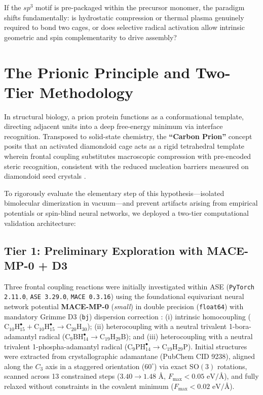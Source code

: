 \documentclass[10pt,twocolumn,a4paper]{article}
\begin{document}
If the $sp^3$ motif is pre-packaged within the precursor monomer, the paradigm shifts fundamentally: is hydrostatic compression or thermal plasma genuinely required to bond two cages, or does selective radical activation allow intrinsic geometric and spin complementarity to drive assembly?

\section{The Prionic Principle and Two-Tier Methodology}
In structural biology, a prion protein functions as a conformational template, directing adjacent units into a deep free-energy minimum via interface recognition. Transposed to solid-state chemistry, the \textbf{``Carbon Prion''} concept posits that an activated diamondoid cage acts as a rigid tetrahedral template wherein frontal coupling substitutes macroscopic compression with pre-encoded steric recognition, consistent with the reduced nucleation barriers measured on diamondoid seed crystals \cite{Gebbie2018}.

To rigorously evaluate the elementary step of this hypothesis—isolated bimolecular dimerization in vacuum—and prevent artifacts arising from empirical potentials or spin-blind neural networks, we deployed a two-tier computational validation architecture:

\subsection{Tier 1: Preliminary Exploration with MACE-MP-0 + D3}
Three frontal coupling reactions were initially investigated within ASE (\texttt{PyTorch 2.11.0}, \texttt{ASE 3.29.0}, \texttt{MACE 0.3.16}) using the foundational equivariant neural network potential \textbf{MACE-MP-0} (\textit{small}) \cite{Batatia2024} in double precision (\texttt{float64}) with mandatory Grimme D3 (\texttt{bj}) dispersion correction \cite{Grimme2010}: (i) intrinsic homocoupling ($\text{C}_{10}\text{H}_{15}^\bullet + \text{C}_{10}\text{H}_{15}^\bullet \to \text{C}_{20}\text{H}_{30}$); (ii) heterocoupling with a neutral trivalent 1-bora-adamantyl radical ($\text{C}_9\text{BH}_{14}^\bullet \to \text{C}_{19}\text{H}_{29}\text{B}$); and (iii) heterocoupling with a neutral trivalent 1-phospha-adamantyl radical ($\text{C}_9\text{PH}_{14}^\bullet \to \text{C}_{19}\text{H}_{29}\text{P}$). Initial structures were extracted from crystallographic adamantane (PubChem CID 9238), aligned along the $C_3$ axis in a staggered orientation ($60^\circ$) via exact $\text{SO}(3)$ rotations, scanned across 13 constrained steps ($3.40 \to 1.48\text{ \AA}$, $F_{\text{max}} < 0.05\text{ eV/\AA}$), and fully relaxed without constraints in the covalent minimum ($F_{\text{max}} < 0.02\text{ eV/\AA}$).
\end{document}
